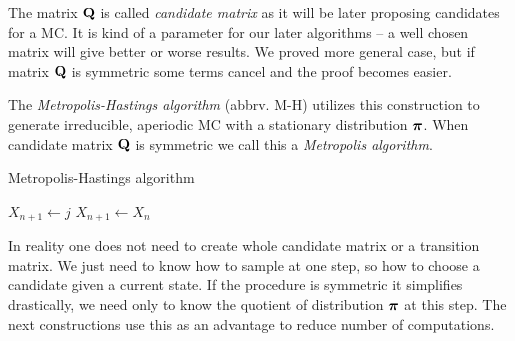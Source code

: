 	The matrix $\mathbf{Q}$ is called \textit{candidate matrix} as it will be later proposing candidates for a MC. It is kind of a parameter for our later algorithms -- a well chosen matrix will give better or worse results. We proved more general case, but if matrix $\mathbf{Q}$ is symmetric some terms cancel and the proof becomes easier.
	
	The \textit{Metropolis-Hastings algorithm} (abbrv. M-H) utilizes this construction to generate irreducible, aperiodic MC with a stationary distribution $\boldsymbol{\pi}$. When candidate matrix $\mathbf{Q}$ is symmetric we call this a \textit{Metropolis algorithm}.
	\begin{algorithm}
		\caption{Metropolis-Hastings algorithm}\label{alg:metro-hast}
		\begin{algorithmic}[1]
				
					\State $X_{n+1} \gets j$
				\Else
					\State $X_{n+1} \gets X_n$
				\EndIf
			\EndFor
		\end{algorithmic}
	\end{algorithm}
	
	In reality one does not need to create whole candidate matrix or a transition matrix. We just need to know how to sample at one step, so how to choose a candidate given a current state. If the procedure is symmetric it simplifies drastically, we need only to know the quotient of distribution $\boldsymbol{\pi}$ at this step. The next constructions use this as an advantage to reduce number of computations.
	